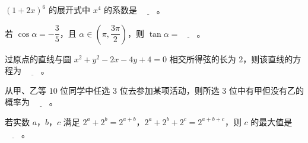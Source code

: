 \begin{question}
$(1+2x)^6$ 的展开式中 $x^4$ 的系数是 $\underline{\qquad}$。

\end{question}
\begin{question}
若 $\cos\alpha=-\dfrac35$，且 $\alpha\in\left(\pi,\dfrac{3\pi}2\right)$，则 $\tan\alpha=\underline{\qquad}$。

\end{question}
\begin{question}
过原点的直线与圆 $x^2+y^2-2x-4y+4=0$ 相交所得弦的长为 $2$，则该直线的方程为 $\underline{\qquad}$。

\end{question}
\begin{question}
从甲、乙等 $10$ 位同学中任选 $3$ 位去参加某项活动，则所选 $3$ 位中有甲但没有乙的概率为 $\underline{\qquad}$。

\end{question}
\begin{question}
若实数 $a$，$b$，$c$ 满足 $2^a+2^b=2^{a+b}$，$2^a+2^b+2^c=2^{a+b+c}$，则 $c$ 的最大值是 $\underline{\qquad}$。

\end{question}

